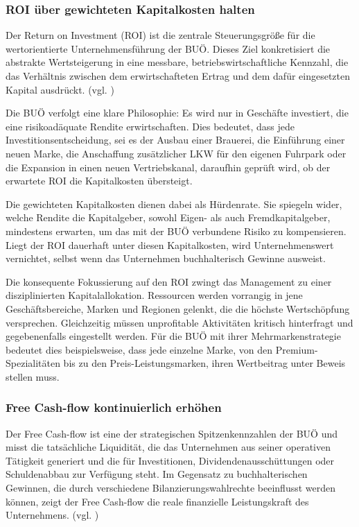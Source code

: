 \subsubsection{ROI über gewichteten Kapitalkosten halten}  

Der Return on Investment (ROI) ist die zentrale Steuerungsgröße für die wertorientierte Unternehmensführung der BUÖ. Dieses Ziel konkretisiert die abstrakte Wertsteigerung in eine messbare, betriebswirtschaftliche Kennzahl, die das Verhältnis zwischen dem erwirtschafteten Ertrag und dem dafür eingesetzten Kapital ausdrückt. (vgl. \cite{ROI}) 

Die BUÖ verfolgt eine klare Philosophie: Es wird nur in Geschäfte investiert, die eine risikoadäquate Rendite erwirtschaften. Dies bedeutet, dass jede Investitionsentscheidung, sei es der Ausbau einer Brauerei, die Einführung einer neuen Marke, die Anschaffung zusätzlicher LKW für den eigenen Fuhrpark oder die Expansion in einen neuen Vertriebskanal, daraufhin geprüft wird, ob der erwartete ROI die Kapitalkosten übersteigt.  

Die gewichteten Kapitalkosten dienen dabei als Hürdenrate. Sie spiegeln wider, welche Rendite die Kapitalgeber, sowohl Eigen- als auch Fremdkapitalgeber, mindestens erwarten, um das mit der BUÖ verbundene Risiko zu kompensieren. Liegt der ROI dauerhaft unter diesen Kapitalkosten, wird Unternehmenswert vernichtet, selbst wenn das Unternehmen buchhalterisch Gewinne ausweist.  

Die konsequente Fokussierung auf den ROI zwingt das Management zu einer disziplinierten Kapitalallokation. Ressourcen werden vorrangig in jene Geschäftsbereiche, Marken und Regionen gelenkt, die die höchste Wertschöpfung versprechen. Gleichzeitig müssen unprofitable Aktivitäten kritisch hinterfragt und gegebenenfalls eingestellt werden. Für die BUÖ mit ihrer Mehrmarkenstrategie bedeutet dies beispielsweise, dass jede einzelne Marke, von den Premium-Spezialitäten bis zu den Preis-Leistungsmarken, ihren Wertbeitrag unter Beweis stellen muss.  

\subsubsection{Free Cash-flow kontinuierlich erhöhen}  

Der Free Cash-flow ist eine der strategischen Spitzenkennzahlen der BUÖ und misst die tatsächliche Liquidität, die das Unternehmen aus seiner operativen Tätigkeit generiert und die für Investitionen, Dividendenausschüttungen oder Schuldenabbau zur Verfügung steht. Im Gegensatz zu buchhalterischen Gewinnen, die durch verschiedene Bilanzierungswahlrechte beeinflusst werden können, zeigt der Free Cash-flow die reale finanzielle Leistungskraft des Unternehmens. (vgl. \cite{Cash_Flow}) 

